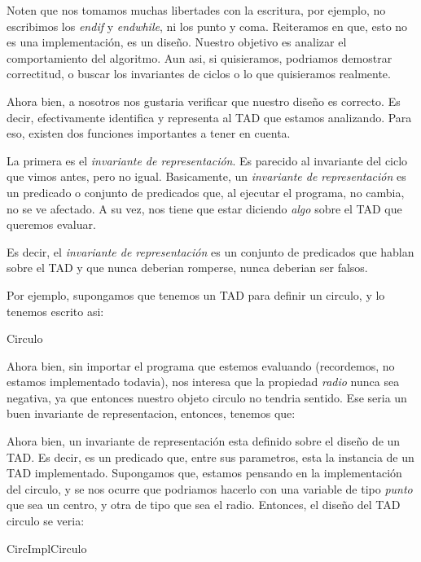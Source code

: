 \documentclass{article}
\begin{document}
Noten que nos tomamos muchas libertades con la escritura, por ejemplo, no escribimos los \textit{endif} y \textit{endwhile}, ni los punto y coma. Reiteramos en que, esto no es una implementación, es un diseño. Nuestro objetivo es analizar el comportamiento del algoritmo. Aun asi, si quisieramos, podriamos demostrar correctitud, o buscar los invariantes de ciclos o lo que quisieramos realmente.

Ahora bien, a nosotros nos gustaria verificar que nuestro diseño es correcto. Es decir, efectivamente identifica y representa al TAD que estamos analizando. Para eso, existen dos funciones importantes a tener en cuenta.

La primera es el \textit{invariante de representación}. Es parecido al invariante del ciclo que vimos antes, pero no igual. Basicamente, un \textit{invariante de representación} es un predicado o conjunto de predicados que, al ejecutar el programa, no cambia, no se ve afectado. A su vez, nos tiene que estar diciendo \textit{algo} sobre el TAD que queremos evaluar.

Es decir, el \textit{invariante de representación} es un conjunto de predicados que hablan sobre el TAD y que nunca deberian romperse, nunca deberian ser falsos.

Por ejemplo, supongamos que tenemos un TAD para definir un circulo, y lo tenemos escrito asi:

\begin{tad}{Circulo}
	 \\
\end{tad}

Ahora bien, sin importar el programa que estemos evaluando (recordemos, no estamos implementado todavia), nos interesa que la propiedad \textit{radio} nunca sea negativa, ya que entonces nuestro objeto circulo no tendria sentido. Ese seria un buen invariante de representacion, entonces, tenemos que:


Ahora bien, un invariante de representación esta definido sobre el diseño de un TAD. Es decir, es un predicado que, entre sus parametros, esta la instancia de un TAD implementado. Supongamos que, estamos pensando en la implementación del circulo, y se nos ocurre que podriamos hacerlo con una variable de tipo \textit{punto} que sea un centro, y otra de tipo {\float} que sea el radio. Entonces, el diseño del TAD circulo se veria:

\begin{modulo}{CircImpl}{Circulo}
	 \\
\end{modulo}
\end{document}
